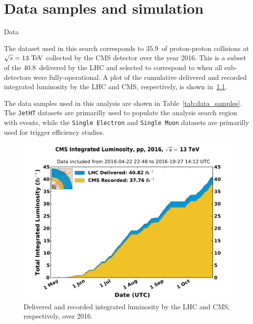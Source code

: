 \chapter{Data samples and simulation}
\begin{section}{Data}

The dataset used in this search corresponds to 35.9~\ifb of proton-proton collisions at $\sqrt{s} = 13~\mathrm{Te\kern -0.1em V}$ collected by the CMS detector over the year 2016.
This is a subset of the 40.8~\ifb delivered by the LHC and selected to correspond to when all sub-detectors were fully-operational.
A plot of the cumulative delivered and recorded integrated luminosity by the LHC and CMS, respectively, is shown in~\ref{fig:lumi_2016}. 

The data samples used in this analysis are shown in Table~\ref{tab:data_samples}.
The \texttt{JetHT} datasets are primarilly used to populate the analysis search region with events, while the \texttt{Single Electron} and \texttt{Single Muon} datasets are primarilly used for trigger efficiency studies.

\begin{figure}[tbp!]
\begin{center}
\includegraphics[angle=0,width=0.80\columnwidth]{fig/lumi_2016.pdf}
\end{center}
\caption{Delivered and recorded integrated luminosity by the LHC and CMS, respectively, over 2016.~\cite{lumi_2016}}
\label{fig:lumi_2016}
\end{figure}


\end{section}
